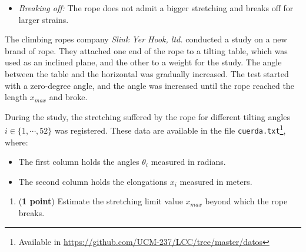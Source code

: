 \begin{paracol}{2}
\begin{itemize}
	\item \emph{Breaking off:} The rope does not admit a bigger stretching and breaks off for larger strains.
\end{itemize}

 The climbing ropes company \emph{Slink Yer Hook, ltd.} conducted a study on a new brand of rope. They attached one end of the rope to a tilting table, which was used as an inclined plane, and the other to a weight for the study. The angle between the table and the horizontal was gradually increased. The test started with a zero-degree angle, and the angle was increased until the rope reached the length $x_{max}$ and broke.
 
During the study, the stretching suffered by the rope for different tilting angles $i \in \{1,\cdots,52\}$ was registered. These data are available in the file \texttt{cuerda.txt}\footnote{Available in \url{https://github.com/UCM-237/LCC/tree/master/datos}}, where:

\begin{itemize}
	\item The first column holds the angles $\theta_i$ measured in radians.
	\item The second column holds the elongations $x_i$ measured in meters.
\end{itemize}

\begin{enumerate}
	\item (\textbf{1 point}) Estimate the stretching limit value $x_{max}$ beyond which the rope breaks.
	

\end{enumerate}
\end{paracol}

